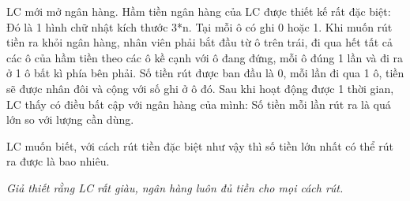 LC mới mở ngân hàng. Hầm tiền ngân hàng của LC được thiết kế rất đặc biệt: Đó là 1 hình chữ nhật kích thước 3*n. Tại mỗi ô có ghi 0 hoặc 1. Khi muốn rút tiền ra khỏi ngân hàng, nhân viên phải bắt đầu từ ô trên trái, đi qua hết tất cả các ô của hầm tiền theo các ô kề cạnh với ô đang đứng, mỗi ô đúng 1 lần và đi ra ở 1 ô bất kì phía bên phải. Số tiền rút được ban đầu là 0, mỗi lần đi qua 1 ô, tiền sẽ được nhân đôi và cộng với số ghi ở ô đó. Sau khi hoạt động được 1 thời gian, LC thấy có điều bất cập với ngân hàng của mình: Số tiền mỗi lần rút ra là quá lớn so với lượng cần dùng.  

   LC muốn biết, với cách rút tiền đặc biệt như vậy thì số tiền lớn nhất có thể rút ra được là bao nhiêu.  

\emph{    Giả thiết rằng LC rất giàu, ngân hàng luôn đủ tiền cho mọi cách rút.   }